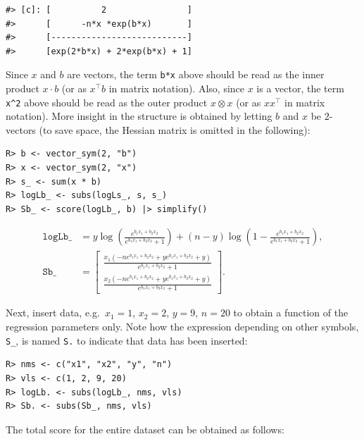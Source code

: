\begin{verbatim}
#> [c]: [          2                ]
#>      [      -n*x *exp(b*x)       ]
#>      [---------------------------]
#>      [exp(2*b*x) + 2*exp(b*x) + 1]
\end{verbatim}

Since \(x\) and \(b\) are vectors, the term \texttt{b*x} above should be read
as the inner product \(x \cdot b\) (or as \(x^\top b\) in matrix
notation). Also, since \(x\) is a vector, the term \texttt{x\^{}2} above should
be read as the outer product \(x \otimes x\) (or as \(x x^\top\) in
matrix notation). More insight in the structure is obtained by
letting \(b\) and \(x\) be \(2\)-vectors (to save space, the Hessian matrix is omitted in the following):

\begin{verbatim}
R> b <- vector_sym(2, "b")
R> x <- vector_sym(2, "x")
R> s_ <- sum(x * b)
R> logLb_ <- subs(logLs_, s, s_)
R> Sb_ <- score(logLb_, b) |> simplify()
\end{verbatim}

\begin{align}
\texttt{logLb}\_ &= y \log{\left(\frac{e^{b_{1} x_{1} + b_{2} x_{2}}}{e^{b_{1} x_{1} + b_{2} x_{2}} + 1} \right)} + \left(n - y\right) \log{\left(1 - \frac{e^{b_{1} x_{1} + b_{2} x_{2}}}{e^{b_{1} x_{1} + b_{2} x_{2}} + 1} \right)}, \\
\texttt{Sb}\_    &= \left[\begin{matrix}\frac{x_{1} \left(- n e^{b_{1} x_{1} + b_{2} x_{2}} + y e^{b_{1} x_{1} + b_{2} x_{2}} + y\right)}{e^{b_{1} x_{1} + b_{2} x_{2}} + 1}\\\frac{x_{2} \left(- n e^{b_{1} x_{1} + b_{2} x_{2}} + y e^{b_{1} x_{1} + b_{2} x_{2}} + y\right)}{e^{b_{1} x_{1} + b_{2} x_{2}} + 1}\end{matrix}\right] .
\end{align}

Next, insert data, e.g.~\(x_{1}=1\), \(x_{2}=2\), \(y=9\), \(n=20\) to obtain a function of the regression parameters only. Note how the expression depending on other symbols, \texttt{S\_}, is
named \texttt{S.} to indicate that data has been inserted:

\begin{verbatim}
R> nms <- c("x1", "x2", "y", "n")
R> vls <- c(1, 2, 9, 20)
R> logLb. <- subs(logLb_, nms, vls)
R> Sb. <- subs(Sb_, nms, vls)
\end{verbatim}

The total score for the entire dataset can be obtained as follows:


